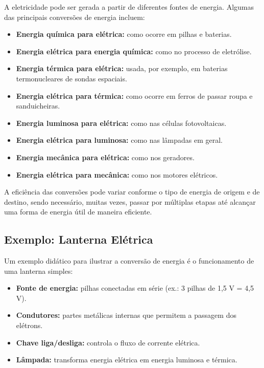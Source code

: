 A eletricidade pode ser gerada a partir de diferentes fontes de energia. Algumas das principais conversões de energia incluem:

\begin{itemize}
    \item \textbf{Energia química para elétrica:} como ocorre em pilhas e baterias.
    \item \textbf{Energia elétrica para energia química:} como no processo de eletrólise.
    \item \textbf{Energia térmica para elétrica:} usada, por exemplo, em baterias termonucleares de sondas espaciais.
    \item \textbf{Energia elétrica para térmica:} como ocorre em ferros de passar roupa e sanduicheiras.
    \item \textbf{Energia luminosa para elétrica:} como nas células fotovoltaicas.
    \item \textbf{Energia elétrica para luminosa:} como nas lâmpadas em geral.
    \item \textbf{Energia mecânica para elétrica:} como nos geradores.
    \item \textbf{Energia elétrica para mecânica:} como nos motores elétricos.
\end{itemize}

A eficiência das conversões pode variar conforme o tipo de energia de origem e de destino, sendo necessário, muitas vezes, passar por múltiplas etapas até alcançar uma forma de energia útil de maneira eficiente.

\subsection*{Exemplo: Lanterna Elétrica}

Um exemplo didático para ilustrar a conversão de energia é o funcionamento de uma lanterna simples:

\begin{itemize}
    \item \textbf{Fonte de energia:} pilhas conectadas em série (ex.: 3 pilhas de 1,5 V = 4,5 V).
    \item \textbf{Condutores:} partes metálicas internas que permitem a passagem dos elétrons.
    \item \textbf{Chave liga/desliga:} controla o fluxo de corrente elétrica.
    \item \textbf{Lâmpada:} transforma energia elétrica em energia luminosa e térmica.
\end{itemize}

